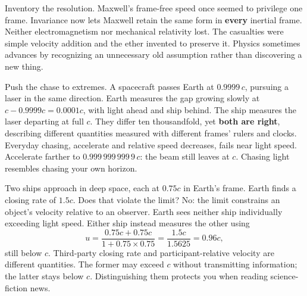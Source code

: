 Inventory the resolution. Maxwell's frame-free speed once seemed to privilege one frame. Invariance now lets Maxwell retain the same form in \textbf{every} inertial frame. Neither electromagnetism nor mechanical relativity lost. The casualties were simple velocity addition and the ether invented to preserve it. Physics sometimes advances by recognizing an unnecessary old assumption rather than discovering a new thing.


\begin{thought}
Push the chase to extremes. A spacecraft passes Earth at \(0.9999\,c\), pursuing a laser in the same direction. Earth measures the gap growing slowly at \(c-0.9999c=0.0001c\), with light ahead and ship behind. The ship measures the laser departing at full \(c\). They differ ten thousandfold, yet \textbf{both are right}, describing different quantities measured with different frames' rulers and clocks. Everyday chasing, accelerate and relative speed decreases, fails near light speed. Accelerate farther to \(0.999\,999\,999\,9\,c\): the beam still leaves at \(c\). Chasing light resembles chasing your own horizon.
\end{thought}

\begin{thought}
Two ships approach in deep space, each at \(0.75c\) in Earth's frame. Earth finds a closing rate of \(1.5c\). Does that violate the limit? No: the limit constrains an object's velocity relative to an observer. Earth sees neither ship individually exceeding light speed. Either ship instead measures the other using
\[
u=\frac{0.75c+0.75c}{1+0.75\times0.75}=\frac{1.5c}{1.5625}=0.96c,
\]
still below \(c\). Third-party closing rate and participant-relative velocity are different quantities. The former may exceed \(c\) without transmitting information; the latter stays below \(c\). Distinguishing them protects you when reading science-fiction news.
\end{thought}


